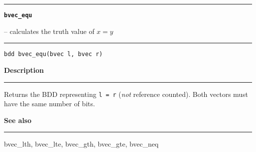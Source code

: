 \begin{minipage}{\textwidth}

\noindent\begin{minipage}{\textwidth}
\rule{\textwidth}{0.5mm}
{\tt\bf bvec\_equ }
\--- calculates the truth value of $x = y$  \hspace{\fill}
\\\rule[1.5ex]{\textwidth}{0.5mm}
\end{minipage}

\noindent\begin{verbatim}
bdd bvec_equ(bvec l, bvec r) 
\end{verbatim}

\vspace{\parsep}\noindent
{\bf Description}\\\rule[1.5ex]{\textwidth}{0.2mm}\vspace{-1.5ex}\setlength{\parindent}{1em}
Returns the BDD representing {\tt l = r}
           ({\em not} reference counted). Both vectors must have the
	   same number of bits. 

\vspace{\parsep}\vspace{\baselineskip}\noindent
{\bf See also}\\\rule[1.5ex]{\textwidth}{0.2mm}\vspace{-1.5ex}
bvec\_lth, bvec\_lte, bvec\_gth, bvec\_gte, bvec\_neq 
\end{minipage}
\vspace{8ex}
